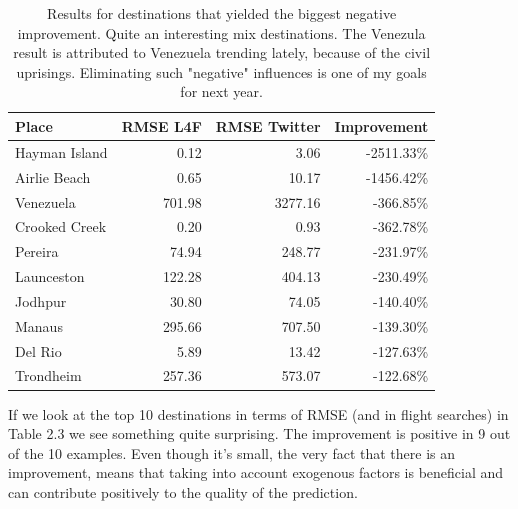 \documentclass[minf,frontabs,twoside,singlespacing,parskip]{infthesis}
\begin{document}
\begin{table}[]
\begin{center}
\begin{tabular}{ l | r | r | r}
Place & RMSE L4F & RMSE Twitter & Improvement \\
\hline
Hayman Island & 0.12 & 3.06 & -2511.33\% \\
Airlie Beach & 0.65 & 10.17 & -1456.42\% \\
Venezuela & 701.98 & 3277.16 & -366.85\% \\
Crooked Creek & 0.20 & 0.93 & -362.78\% \\
Pereira & 74.94 & 248.77 & -231.97\% \\
Launceston & 122.28 & 404.13 & -230.49\% \\
Jodhpur & 30.80 & 74.05 & -140.40\% \\
Manaus & 295.66 & 707.50 & -139.30\% \\
Del Rio & 5.89 & 13.42 & -127.63\% \\
Trondheim & 257.36 & 573.07 & -122.68\%
\end{tabular}
\end{center}
\caption{Results for destinations that yielded the biggest negative improvement. Quite an interesting mix destinations. The Venezula result is attributed to Venezuela trending lately, because of the civil uprisings. Eliminating such "negative" influences is one of my goals for next year.}
\end{table}


If we look at the top 10 destinations in terms of RMSE (and in flight searches) in Table 2.3 we see something quite surprising.  The improvement is positive in 9 out of the 10 examples. Even though it's small, the very fact that there is an improvement, means that taking into account exogenous factors is beneficial and can contribute positively to the quality of the prediction.
\end{document}
